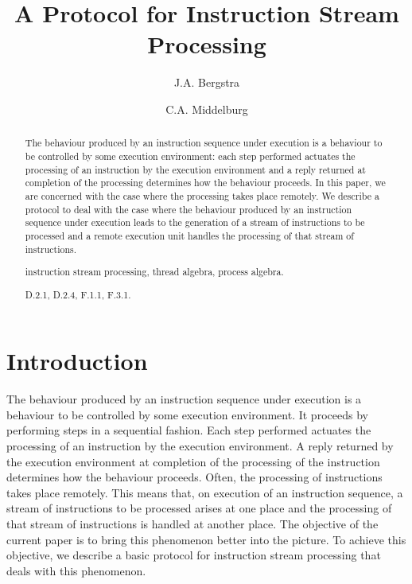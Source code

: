 \documentclass[fleqn]{llncs}
\title{A Protocol for Instruction Stream Processing}
\author{J.A. Bergstra \and C.A. Middelburg}
\institute{Informatics Institute, Faculty of Science,
           University of Amsterdam, \\
           Science Park~107, 1098~XG Amsterdam, the Netherlands \\
           \email{J.A.Bergstra@uva.nl,C.A.Middelburg@uva.nl}}
\begin{document}
\maketitle

\begin{abstract}
The behaviour produced by an instruction sequence under execution is a
behaviour to be controlled by some execution environment: each step
performed actuates the processing of an instruction by the execution
environment and a reply returned at completion of the processing
determines how the behaviour proceeds.
In this paper, we are concerned with the case where the processing takes
place remotely.
We describe a protocol to deal with the case where the behaviour
produced by an instruction sequence under execution leads to the
generation of a stream of instructions to be processed and a remote
execution unit handles the processing of that stream of instructions.
\begin{keywords}
instruction stream processing,
thread algebra, process algebra.
\end{keywords}\begin{classcode}
D.2.1, D.2.4, F.1.1, F.3.1.
\end{classcode}
\end{abstract}

\section{Introduction}
\label{sect-intro}

The behaviour produced by an instruction sequence under execution is a
behaviour to be controlled by some execution environment.
It proceeds by performing steps in a sequential fashion.
Each step performed actuates the processing of an instruction by the
execution environment.
A reply returned by the execution environment at completion of the
processing of the instruction determines how the behaviour proceeds.
Often, the processing of instructions takes place remotely.
This means that, on execution of an instruction sequence, a stream of
instructions to be processed arises at one place and the processing of
that stream of instructions is handled at another place.
The objective of the current paper is to bring this phenomenon better
into the picture.
To achieve this objective, we describe a basic protocol for instruction
stream processing that deals with this phenomenon.
\end{document}

